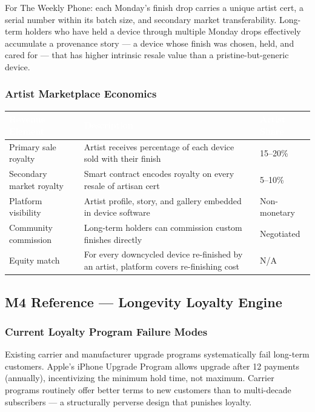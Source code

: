 \documentclass[11pt,letterpaper]{article}
\newcommand{\tableheader}[1]{\textbf{\sffamily\textcolor{white}{#1}}}
\begin{document}
For The Weekly Phone: each Monday's finish drop carries a unique artist cert, a serial number within its batch size, and secondary market transferability. Long-term holders who have held a device through multiple Monday drops effectively accumulate a provenance story --- a device whose finish was chosen, held, and cared for --- that has higher intrinsic resale value than a pristine-but-generic device.

\subsubsection{Artist Marketplace Economics}

\begin{center}
\begin{tabularx}{\textwidth}{L{4cm}XC{2cm}}
\toprule
{}
\tableheader{Revenue Element} & \tableheader{Description} & \tableheader{Artist Share} \\
\midrule
Primary sale royalty & Artist receives percentage of each device sold with their finish & 15--20\% \\
Secondary market royalty & Smart contract encodes royalty on every resale of artisan cert & 5--10\% \\
Platform visibility & Artist profile, story, and gallery embedded in device software & Non-monetary \\
Community commission & Long-term holders can commission custom finishes directly & Negotiated \\
Equity match & For every downcycled device re-finished by an artist, platform covers re-finishing cost & N/A \\
\bottomrule
\end{tabularx}
\end{center}

\subsection{M4 Reference --- Longevity Loyalty Engine}

\subsubsection{Current Loyalty Program Failure Modes}

Existing carrier and manufacturer upgrade programs systematically fail long-term customers. Apple's iPhone Upgrade Program allows upgrade after 12 payments (annually), incentivizing the minimum hold time, not maximum. Carrier programs routinely offer better terms to new customers than to multi-decade subscribers --- a structurally perverse design that punishes loyalty.
\end{document}
